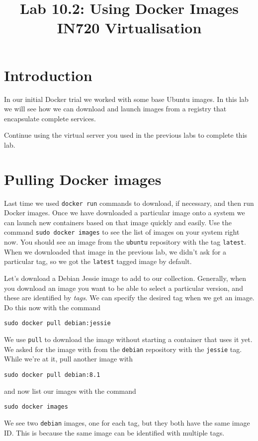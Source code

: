 \documentclass{article}
\begin{document}
\title{Lab 10.2: Using Docker Images\\ IN720 Virtualisation}
\date{}
\maketitle

\section*{Introduction}
In our initial Docker trial we worked with some base Ubuntu images.  In this lab we will see how we can download and launch images from a registry that encapsulate complete services.

Continue using the virtual server you used in the previous labs to complete this lab.

\section{Pulling Docker images}
Last time we used \texttt{docker run} commands to download, if necessary, and then run Docker images.  Once we have downloaded a particular image onto a system we can launch new containers based on that image quickly and easily.  Use the command \texttt{sudo docker images} to see the list of images on your system right now.  You should see an image from the \texttt{ubuntu} repository with the tag \texttt{latest}.  When we downloaded that image in the previous lab, we didn't ask for a particular tag, so we got the \texttt{latest} tagged image by default.

Let's download a Debian Jessie image to add to our collection.  Generally, when you download an image you want to be able to select a particular version, and these are identified by \emph{tags}.  We can specify the desired tag when we get an image.  Do this now with the command

\texttt{sudo docker pull debian:jessie}

We use \texttt{pull} to download the image without starting a container that uses it yet.  We asked for the image with from the \texttt{debian} repository with the \texttt{jessie} tag. While we're at it, pull another image with

\texttt{sudo docker pull debian:8.1}

and now list our images with the command

\texttt{sudo docker images}

We see two \texttt{debian} images, one for each tag, but they both have the same image ID. This is because the same image can be identified with multiple tags.
\end{document}
